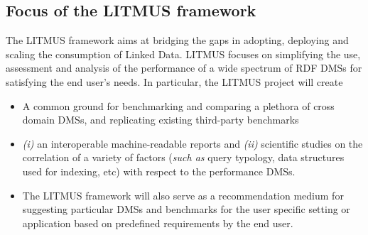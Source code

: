 \documentclass{llncs}
\begin{document}
    \subsection{Focus of the LITMUS framework}
        The LITMUS framework aims at bridging the gaps in adopting, deploying and scaling the consumption of Linked Data. LITMUS focuses on simplifying the use, assessment and analysis of the performance of a wide spectrum of RDF DMSs for satisfying the end user's needs. In particular, the LITMUS project will create    \begin{itemize}[nosep]
            \item {} A common ground for benchmarking and comparing a plethora of cross domain DMSs, and replicating existing third-party benchmarks 
            \item {} \textit{(i)} an interoperable machine-readable reports and \textit{(ii)} scientific studies on the correlation of a variety of factors (\textit{such as} query typology, data structures used for indexing, etc) with respect to the performance DMSs. 
            \item {} The LITMUS framework will also serve as a recommendation medium for suggesting particular DMSs and benchmarks for the user specific setting or application based on predefined requirements by the end user.  
        \end{itemize}  
\end{document}
